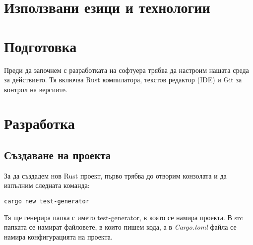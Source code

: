 \section{Използвани езици и технологии}



%
%





\section{Подготовка}
Преди да започнем с разработката на софтуера трябва да настроим нашата среда за
действието. Тя включва Rust компилатора, текстов редактор (IDE) и Git за
контрол на версиитe.





\section{Разработка}

\subsection{Създаване на проекта}
За да създадем нов Rust проект, първо трябва до отворим конзолата и да изпълним следната команда:
\begin{lstlisting}
cargo new test-generator
\end{lstlisting}

Тя ще генерира папка с името test-generator, в която се намира проекта. В src
папката се намират файловете, в които пишем кода, а в \textit{Cargo.toml} файла се намира
конфигурацията на проекта.

